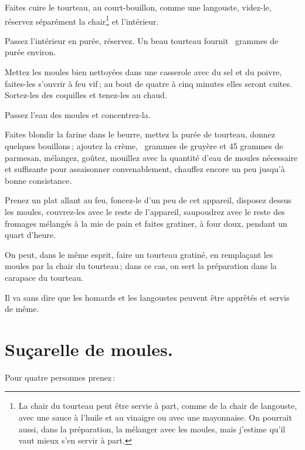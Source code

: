 Faites cuire le tourteau, au court-bouillon, comme une langouste, videz-le,
réservez séparément la chair\footnote{La chair du tourteau peut être servie
à part, comme de la chair de langouste, avec une sauce à l'huile et au vinaigre
ou avec une mayonnaise. On pourrait aussi, dans la préparation, la mélanger
avec les moules, mais j'estime qu'il vaut mieux s'en servir à part.} et
l'intérieur.

Passez l'intérieur en purée, réservez. Un beau tourteau fournit {\mmm} grammes
de purée environ.

Mettez les moules bien nettoyées dans une casserole avec du sel et du poivre,
faites-les s'ouvrir à feu vif ; au bout de quatre à cinq minutes elles seront
cuites. Sortez-les des coquilles et tenez-les au chaud.

Passez l'eau des moules et concentrez-la.

Faites blondir la farine dans le beurre, mettez la purée de tourteau, donnez
quelques bouillons ; ajoutez la crème, {\mmm} grammes de gruyère et 45 grammes de
parmesan, mélangez, goûtez, mouillez avec la quantité d'eau de moules
nécessaire et suffisante pour assaisonner convenablement, chauffez encore un
peu jusqu'à bonne consistance.

Prenez un plat allant au feu, foncez-le d'un peu de cet appareil, disposez
dessus les moules, couvrez-les avec le reste de l'appareil, saupoudrez avec le
reste des fromages mélangés à la mie de pain et faites gratiner, à four doux,
pendant un quart d'heure.

\sk

On peut, dans le même esprit, faire un tourteau gratiné, en remplaçant les
moules par la chair du tourteau ; dans ce cas, on sert la préparation dans la
carapace du tourteau.

\sk

Il va sans dire que les homards et les langoustes peuvent être apprêtés et
servis de même.

\section*{\centering Suçarelle de moules.}

Pour quatre personnes prenez :

\medskip


